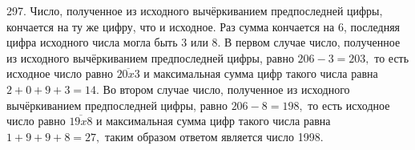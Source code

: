 297. Число, полученное из исходного вычёркиванием предпоследней цифры, кончается на ту же цифру, что и исходное. Раз сумма кончается на 6, последняя цифра исходного числа могла быть 3 или 8. В первом случае число, полученное из исходного вычёркиванием предпоследней цифры, равно $206-3=203,$ то есть исходное число равно $\overline{20x3}$ и максимальная сумма цифр такого числа равна $2+0+9+3=14.$ Во втором случае число, полученное из исходного вычёркиванием предпоследней цифры, равно $206-8=198,$ то есть исходное число равно $\overline{19x8}$ и максимальная сумма цифр такого числа равна $1+9+9+8=27,$ таким образом ответом является число 1998.\\
